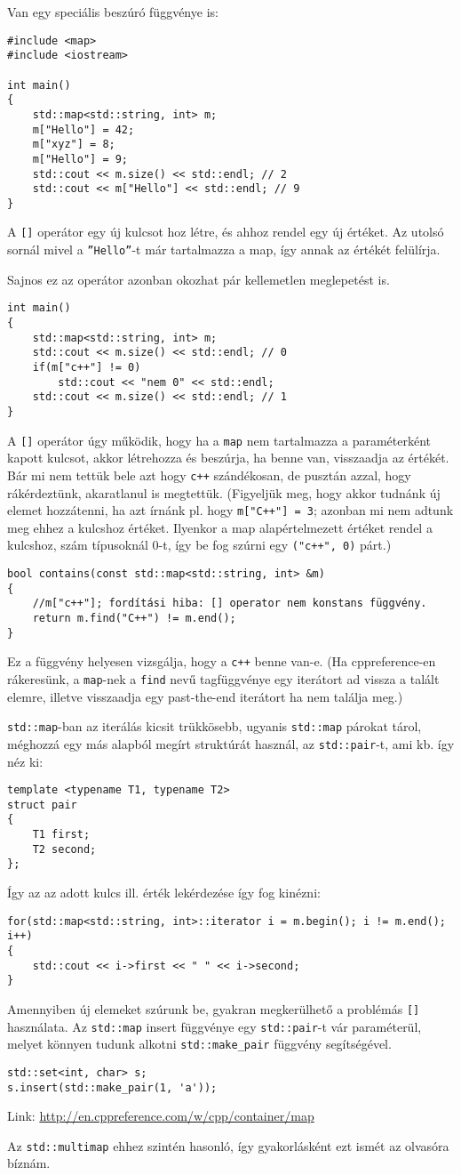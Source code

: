 \documentclass[a4paper,11.5pt,table]{article}
\begin{document}
	Van egy speciális beszúró függvénye is:
\begin{lstlisting}
#include <map>
#include <iostream>

int main()
{
	std::map<std::string, int> m;
	m["Hello"] = 42;
	m["xyz"] = 8;
	m["Hello"] = 9;
	std::cout << m.size() << std::endl; // 2
	std::cout << m["Hello"] << std::endl; // 9
}
\end{lstlisting}
	A \texttt{[]} operátor egy új kulcsot hoz létre, és ahhoz rendel egy új értéket. Az utolsó sornál mivel a \texttt{''Hello''}-t már tartalmazza a map, így annak az értékét felülírja.
	
	\medskip
	Sajnos ez az operátor azonban okozhat pár kellemetlen meglepetést is.
	\begin{lstlisting}
int main()
{
	std::map<std::string, int> m;
	std::cout << m.size() << std::endl; // 0
	if(m["c++"] != 0)
		std::cout << "nem 0" << std::endl;
	std::cout << m.size() << std::endl; // 1
}
	\end{lstlisting}
	A \texttt{[]} operátor úgy működik, hogy ha a \texttt{map} nem tartalmazza a paraméterként kapott kulcsot, akkor létrehozza és beszúrja, ha benne van, visszaadja az értékét. Bár mi nem tettük bele azt hogy \texttt{c++} szándékosan, de pusztán azzal, hogy rákérdeztünk, akaratlanul is megtettük. (Figyeljük meg, hogy akkor tudnánk új elemet hozzátenni, ha azt írnánk pl. hogy \texttt{m["C++"] = 3}; azonban mi nem adtunk meg ehhez a kulcshoz értéket. Ilyenkor a map alapértelmezett értéket rendel a kulcshoz, szám típusoknál 0-t, így be fog szúrni egy \texttt{("c++", 0)} párt.)
	\begin{lstlisting}
bool contains(const std::map<std::string, int> &m)
{
	//m["c++"]; fordítási hiba: [] operator nem konstans függvény.
	return m.find("C++") != m.end();
}
	\end{lstlisting}
	Ez a függvény helyesen vizsgálja, hogy a \texttt{c++} benne van-e. (Ha cppreference-en rákeresünk, a \texttt{map}-nek a \texttt{find} nevű tagfüggvénye egy iterátort ad vissza a talált elemre, illetve visszaadja egy past-the-end iterátort ha nem találja meg.)
	\medskip
	
	
	\texttt{std::map}-ban az iterálás kicsit trükkösebb, ugyanis \texttt{std::map} párokat tárol, méghozzá egy más alapból megírt struktúrát használ, az \texttt{std::pair}-t, ami kb. így néz ki:
	\begin{lstlisting}
template <typename T1, typename T2>
struct pair
{
	T1 first;
	T2 second;
};
	\end{lstlisting}
	Így az az adott kulcs ill. érték lekérdezése így fog kinézni:
	\begin{lstlisting}
for(std::map<std::string, int>::iterator i = m.begin(); i != m.end(); i++)
{
	std::cout << i->first << " " << i->second;
}
	\end{lstlisting}
	Amennyiben új elemeket szúrunk be, gyakran megkerülhető a problémás \texttt{[]} használata. Az \texttt{std::map} insert függvénye egy \texttt{std::pair}-t vár paraméterül, melyet könnyen tudunk alkotni \texttt{std::make\_pair} függvény segítségével.
	\begin{lstlisting}
std::set<int, char> s;
s.insert(std::make_pair(1, 'a'));
	\end{lstlisting}
	
	Link: \url{http://en.cppreference.com/w/cpp/container/map}
	\begin{note}
		Az \texttt{std::multimap} ehhez szintén hasonló, így gyakorlásként ezt ismét az olvasóra bíznám.
	\end{note}
\end{document}
